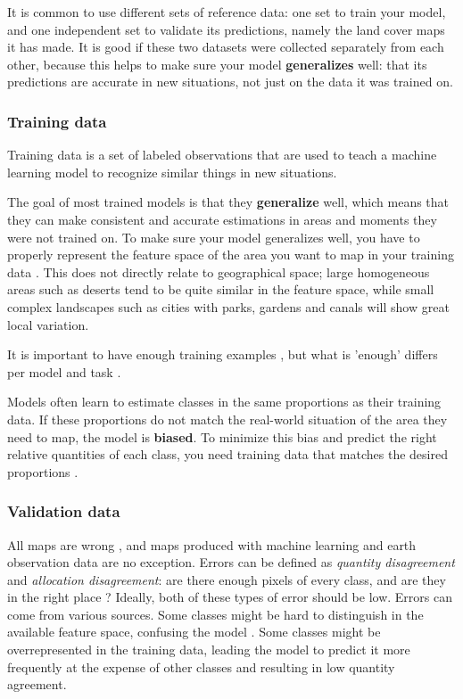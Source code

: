     It is common to use different sets of reference data: one set to train your model, and one independent set to validate its predictions, namely the land cover maps it has made. It is good if these two datasets were collected separately from each other, because this helps to make sure your model \textbf{generalizes} well: that its predictions are accurate in new situations, not just on the data it was trained on.

    \subsubsection*{Training data}

        Training data is a set of labeled observations that are used to teach a machine learning model to recognize similar things in new situations. 
        
        The goal of most trained models is that they \textbf{generalize} well, which means that they can make consistent and accurate estimations in areas and moments they were not trained on. To make sure your model generalizes well, you have to properly represent the feature space of the area you want to map in your training data \citep{meyer2021predicting}. This does not directly relate to geographical space; large homogeneous areas such as deserts tend to be quite similar in the feature space, while small complex landscapes such as cities with parks, gardens and canals will show great local variation. 

        It is important to have enough training examples \citep{ramezan2021effects,rodriguez-perez2017influence,zhu2016optimizing}, but what is 'enough' differs per model  \citep{myburgh2014impact} and task \citep{koshute2021recommending}.
        
        Models often learn to estimate classes in the same proportions as their training data. If these proportions do not match the real-world situation of the area they need to map, the model is \textbf{biased}. To minimize this bias and predict the right relative quantities of each class, you need training data that matches the desired proportions \citep{he2009learning, kleinewillinghofer2022unbiased}.
        
    \subsubsection*{Validation data}

        All maps are wrong \citep{monmonier2018how}, and maps produced with machine learning and earth observation data are no exception. Errors can be defined as \textit{quantity disagreement} and \textit{allocation disagreement}: are there enough pixels of every class, and are they in the right place \citep{pontius2006can,pontius2011death}? Ideally, both of these types of error should be low. Errors can come from various sources. Some classes might be hard to distinguish in the available feature space, confusing the model \citep{shivakumar2017spectral}. Some classes might be overrepresented in the training data, leading the model to predict it more frequently at the expense of other classes and resulting in low quantity agreement.

